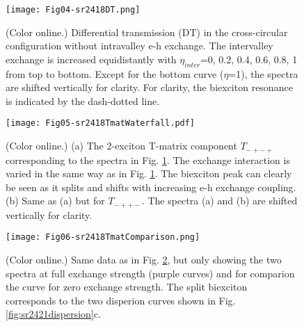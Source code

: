 \documentclass[aps,prb,superscriptaddress,letterpaper,amsmath,amssymb,twocolumn,preprintnumbers]{revtex4}
\begin{document}
\begin{figure}
	\centering
	\texttt{[image: Fig04-sr2418DT.png]}
	\caption{
		(Color online.)
		Differential transmission (DT) in the cross-circular configuration without intravalley e-h exchange. The intervalley exchange is increased equidistantly with $\eta_{inter}$=0, 0.2, 0.4, 0.6, 0.8, 1 from top to bottom. Except for the bottom curve ($\eta$=1), the spectra are shifted vertically
for clarity. For clarity, the biexciton resonance is indicated by the dash-dotted line.}	
	\label{fig:sr2418DT}
\end{figure}



\begin{figure}
	\centering
	\texttt{[image: Fig05-sr2418TmatWaterfall.pdf]}
	\caption{
		(Color online.)
		(a) The 2-exciton T-matrix component   $T_{-+-+}$ corresponding to the spectra in Fig. \protect\ref{fig:sr2418DT}. The exchange interaction is varied in the
same way as in  Fig. \protect\ref{fig:sr2418DT}. The biexciton peak can clearly be seen as it splits and shifts with increasing e-h exchange coupling.
(b) Same as (a) but for  $T_{-++-}$. The spectra (a) and (b) are  shifted vertically for clarity.	 }	
	\label{fig:sr2418TmatWaterfall}
\end{figure}



\begin{figure}
	\centering
	\texttt{[image: Fig06-sr2418TmatComparison.png]}
	\caption{
		(Color online.)
		Same data as in Fig. \protect\ref{fig:sr2418TmatWaterfall}, but only showing the two spectra at full exchange strength (purple curves) and for comparion the curve for zero exchange strength. The split biexciton corresponds to the two disperion curves shown in
Fig. \protect\ref{fig:sr2421dispersion}c.
  }	
	\label{fig:sr2418TmatComparison}
\end{figure}
\end{document}
